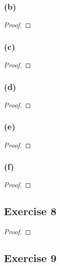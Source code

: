 \documentclass[14pt]{extarticle}
\begin{document}
\subsubsection{(b)}

\begin{proof}

\end{proof}

\subsubsection{(c)}

\begin{proof}

\end{proof}

\subsubsection{(d)}

\begin{proof}

\end{proof}

\subsubsection{(e)}

\begin{proof}

\end{proof}

\subsubsection{(f)}

\begin{proof}

\end{proof}

\subsection{Exercise 8}

\begin{proof}

\end{proof}

\subsection{Exercise 9}
\end{document}
